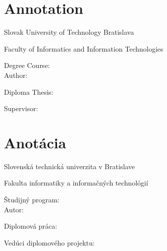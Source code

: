 
\thispagestyle{empty}

\section*{Annotation}

\begin{minipage}[t]{1\columnwidth}%
Slovak University of Technology Bratislava 

Faculty of Informatics and Information Technologies

Degree Course: \myStudyProgram\\

Author: \myName

Diploma Thesis: \myTitle

Supervisor: \mySupervisor

\myDate%
\end{minipage}

\bigskip{}


\newpage{}\thispagestyle{empty}

\newpage
\thispagestyle{empty}
\mbox{}
\newpage

\thispagestyle{empty}
\section*{Anotácia}

\begin{minipage}[t]{1\columnwidth}%
Slovenská technická univerzita v Bratislave

Fakulta informatiky a informačných technológií

Študijný program: \myStudyProgram\\

Autor: \myName

Diplomová práca: \myTitle

Vedúci diplomového projektu: \mySupervisor

\myDate%
\end{minipage}

\bigskip{}


\newpage{}\thispagestyle{empty}\medskip{}


\newpage{}

\newpage
\thispagestyle{empty}
\mbox{}
\newpage

\newpage
\thispagestyle{empty}
\newpage


\thispagestyle{empty}
\mbox{}
\newpage


